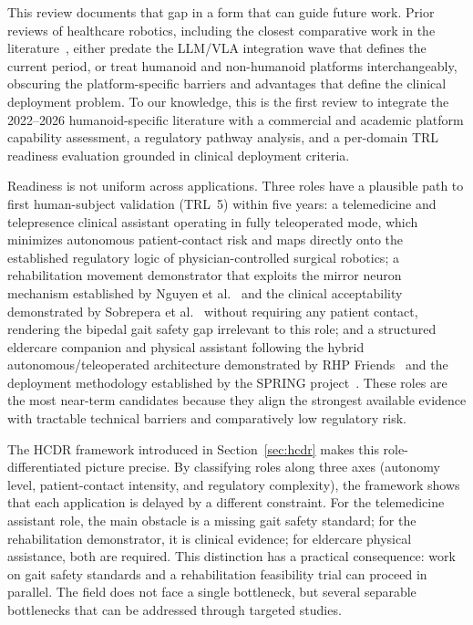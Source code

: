 \documentclass[acmsmall]{acmart}
\begin{document}
This review documents that gap in a form that can guide future work. Prior
reviews of healthcare robotics, including the
closest comparative work in the literature~\cite{cunha2025humanoid}, either
predate the LLM/VLA integration wave that defines the current period, or treat
humanoid and non-humanoid platforms interchangeably,
obscuring the platform-specific barriers and advantages that define the clinical
deployment problem. To our knowledge, this is the first review to integrate the
2022--2026 humanoid-specific literature with a commercial and academic platform
capability assessment, a regulatory pathway analysis, and a per-domain TRL
readiness evaluation grounded in clinical deployment criteria.

Readiness is not uniform across applications. Three roles have a plausible path to
first human-subject validation (TRL~5) within five years: a telemedicine and
telepresence clinical assistant operating in fully teleoperated mode, which
minimizes autonomous patient-contact risk and maps directly onto the established
regulatory logic of physician-controlled surgical robotics; a rehabilitation
movement demonstrator that exploits the mirror neuron mechanism established by
Nguyen et al.~\cite{nguyen2024eeg} and the clinical acceptability demonstrated by
Sobrepera et al.~\cite{sobrepera2022feasibility} without requiring any patient
contact, rendering the bipedal gait safety gap irrelevant to this role; and a
structured eldercare companion and physical assistant following the hybrid
autonomous/teleoperated architecture demonstrated by RHP
Friends~\cite{benallegue2025rhp} and the deployment methodology established by
the SPRING project~\cite{alamedapineda2024spring}. These roles are the most
near-term candidates because they align the strongest available evidence with
tractable technical barriers and comparatively low regulatory risk.

The HCDR framework introduced in Section~\ref{sec:hcdr} makes this
role-differentiated picture precise. By classifying roles along three axes (autonomy
level, patient-contact intensity, and regulatory complexity), the framework
shows that each application is delayed by a different constraint. For the
telemedicine assistant role, the main obstacle is a missing gait safety standard;
for the rehabilitation demonstrator, it is clinical evidence; for eldercare
physical assistance, both are required. This distinction has a practical
consequence: work on gait safety standards and a rehabilitation feasibility trial
can proceed in parallel. The field does not face a single bottleneck, but several
separable bottlenecks that can be addressed through targeted studies.
\end{document}
